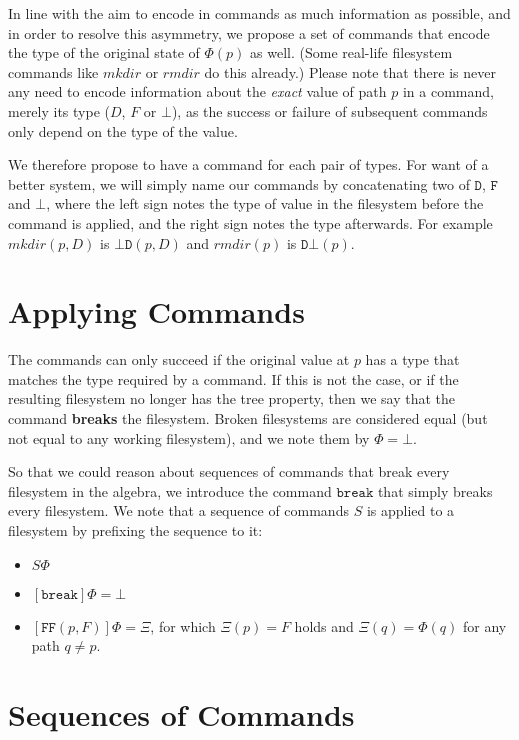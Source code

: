 \documentclass[12pt]{article}
\newcommand{\empt}{\bot}
\newcommand{\FS}{\Phi} %
\newcommand{\GS}{\Xi} %
\newcommand{\cbrk}{\mathtt{break}}
\newcommand{\fscommand}[2]{{#1#2}}
\newcommand{\fsregcommandchar}[1]{\mathtt{#1}}
\newcommand{\fsregcommand}[2]{\fscommand{\fsregcommandchar{#1}}{\fsregcommandchar{#2}}}
\newcommand{\cbd}{\fsregcommand{\empt}{D}}
\newcommand{\cff}{\fsregcommand{F}{F}}
\newcommand{\cdb}{\fsregcommand{D}{\empt}}
\begin{document}
In line with the aim to encode in commands as much information as possible,
and in order to resolve this asymmetry, we propose a set of commands that encode
the type of the original state of $\FS(p)$ as well.
(Some real-life filesystem commands like $mkdir$ or $rmdir$ do this already.)
Please note that there is never any need to encode information about the
{\it exact} value of path $p$ in a command, merely its type ($D$, $F$ or $\empt$),
as the success or failure of subsequent commands only depend on the type of the value.

We therefore propose to have a command for each pair of types.
For want of a better system, we will simply name our commands by concatenating
two of $\fsregcommandchar{D}$, $\fsregcommandchar{F}$ and $\fsregcommandchar{\empt}$, 
where the left sign notes the type of value
in the filesystem before the command is applied, and the right sign notes the type
afterwards. For example $mkdir(p,D)$ is $\cbd(p,D)$ and $rmdir(p)$ is $\cdb(p)$.


\section{Applying Commands}

The commands can only succeed if the original value at $p$ has a type that matches
the type required by a command. If this is not the case, or if the resulting
filesystem no longer has the tree property, then we say that the command
\textbf{breaks} the filesystem. Broken filesystems are considered equal
(but not equal to any working filesystem), and we note them by $\FS=\empt$.

So that we could reason about sequences of commands that break every filesystem
in the algebra, we introduce the command $\cbrk$ that simply breaks every filesystem.
We note that a sequence of commands $S$ is applied to a filesystem
by prefixing the sequence to it:
\begin{itemize}
\item $S\FS$
\item $[\cbrk]\FS=\empt$
\item $[\cff(p,F)]\FS = \GS$, for which $\GS(p)=F$ holds
and $\GS(q)=\FS(q)$ for any path $q\neq p$.
\end{itemize}

\section{Sequences of Commands}
\end{document}
